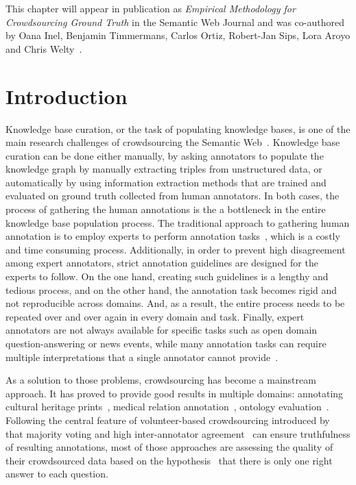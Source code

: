 This chapter will appear in publication as \textit{Empirical Methodology for Crowdsourcing Ground Truth} in the Semantic Web Journal and was co-authored by Oana Inel, Benjamin Timmermans, Carlos Ortiz, Robert-Jan Sips, Lora Aroyo and Chris Welty~\cite{dumitracheempirical}.

\section{Introduction}
\label{sec:introduction}


Knowledge base curation, or the task of populating knowledge bases, is one of the main research challenges of crowdsourcing the Semantic Web~\cite{sarasua2015crowdsourcing}. Knowledge base curation can be done either manually, by asking annotators to populate the knowledge graph by manually extracting triples from unstructured data, or automatically by using information extraction methods that are trained and evaluated on ground truth collected from human annotators. In both cases, the process of gathering the human annotations is the a bottleneck in the entire knowledge base population process. The traditional approach to gathering human annotation is to employ experts to perform annotation tasks~\cite{welty2012query}, which is a costly and time consuming process. Additionally, in order to prevent high disagreement among expert annotators, strict annotation guidelines are designed for the experts to follow. On the one hand, creating such guidelines is a lengthy and tedious process, and on the other hand, the annotation task becomes rigid and not reproducible across domains. And, as a result, the entire process needs to be repeated over and over again in every domain and task. Finally, expert annotators are not always available for specific tasks such as open domain question-answering or news events, while many annotation tasks can require multiple interpretations that a single annotator cannot provide~\cite{aroyo2012harnessing}.

As a solution to those problems, crowdsourcing has become a mainstream approach. It has proved to provide good results in multiple domains: annotating cultural heritage prints~\cite{oosterman2014crowdsourcing}, medical relation annotation~\cite{aroyo2013measuring}, ontology evaluation~\cite{noy2013mechanical}. Following the central feature of volunteer-based crowdsourcing introduced by~\cite{von2009human} that majority voting and high inter-annotator agreement~\cite{Carletta1996} can ensure truthfulness of resulting annotations, most of those approaches are assessing the quality of their crowdsourced data based on the hypothesis~\cite{nowak2010reliable} that there is only one right answer to each question.

